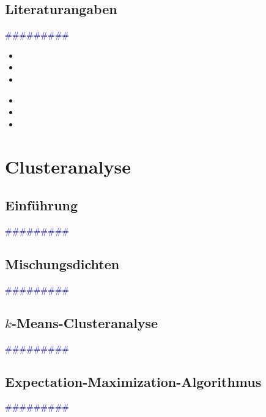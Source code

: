 \documentclass{article}
\begin{document}
  \subsection{Literaturangaben} %
      \textcolor{blue}{\#\#\#\#\#\#\#\#\#}

      \begin{itemize}
      \color{red}
        \item 
        \item
        \item
      \end{itemize}


      \begin{itemize}
      \color{ForestGreen}
        \item 
        \item
        \item
      \end{itemize}



\newpage
\section{Clusteranalyse} %
  \subsection{Einführung} %
      \textcolor{blue}{\#\#\#\#\#\#\#\#\#}
  \subsection{Mischungsdichten} %
      \textcolor{blue}{\#\#\#\#\#\#\#\#\#}
  \subsection{$k$-Means-Clusteranalyse} %
      \textcolor{blue}{\#\#\#\#\#\#\#\#\#}
  \subsection{Expectation-Maximization-Algorithmus} %
      \textcolor{blue}{\#\#\#\#\#\#\#\#\#}
\end{document}
